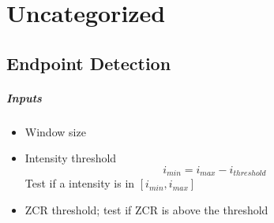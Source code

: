 \chapter{Uncategorized}

\section{Endpoint Detection}

  \paragraph{Inputs}
  \begin{itemize}
    \item Window size
    \item Intensity threshold
    \begin{equation}
      i_{min} = i_{max} - i_{threshold}
    \end{equation}
    Test if a intensity is in $ \left[i_{min}, i_{max}\right] $

    \item ZCR threshold; test if ZCR is above the threshold
  \end{itemize}
